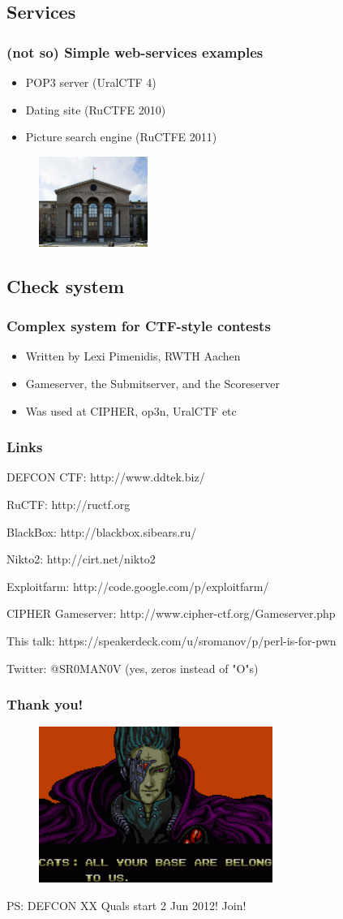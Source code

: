 \documentclass{beamer}
\begin{document}
\subsection{Services}
\frame
{
\frametitle{(not so) Simple web-services examples}
\begin{itemize}
\item POP3 server (UralCTF 4)
\item Dating site (RuCTFE 2010)
\item Picture search engine (RuCTFE 2011)
\end{itemize}
\linebreak

\pause
{}
\begin{figure}
\includegraphics[width=1.4in,height=1.2	in]{pics/usu.jpg}
\end{figure}
}

\subsection{Check system}
\frame
{
\frametitle{Complex system for CTF-style contests}
\begin{itemize}
\item<1-> Written by Lexi Pimenidis, RWTH Aachen
\item<1-> Gameserver, the Submitserver, and the Scoreserver
\item<1-> Was used at CIPHER, op3n, UralCTF	etc
\end{itemize}
}

\frame
{
\frametitle{Links}
\item DEFCON CTF: http://www.ddtek.biz/
\item RuCTF: http://ructf.org
\item BlackBox: http://blackbox.sibears.ru/
\item Nikto2: http://cirt.net/nikto2
\item Exploitfarm: http://code.google.com/p/exploitfarm/
\item CIPHER Gameserver: http://www.cipher-ctf.org/Gameserver.php
\item This talk: https://speakerdeck.com/u/sromanov/p/perl-is-for-pwn
\item Twitter: @SR0MAN0V (yes, zeros instead of "O"s)
}

\frame
{
\frametitle{Thank you!}
\begin{figure}
\includegraphics[width=3in,height=2in]{pics/aybabtu.png}
\end{figure}

PS: DEFCON XX Quals start 2 Jun 2012! Join!
}
\end{document}
